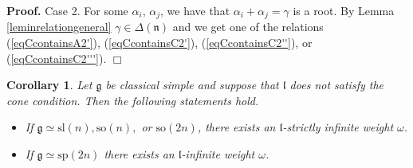 \documentclass[12pt]{report}
\newtheorem{corollary}[theo]{Corollary}
\newenvironment{proof}[1][]{ \textbf{Proof#1. }}{$\Box$\medskip}
\newcommand{\nn}{\mathfrak{n}}
\newcommand{\gG}{\mathfrak{g}}
\newcommand{\lL}{\mathfrak{l}}
\newcommand{\refle}[1]{Lemma \ref{#1}}
\newcommand{\refeq}[1]{(\ref{#1})}
\newcommand{\sL}{\mathrm{sl}}
\newcommand{\sP}{\mathrm{sp}}
\newcommand{\so}{\mathrm{so}}
\begin{document}
\begin{proof}
\smallskip\noindent Case 2. For some $\alpha_i$, $\alpha_j$, we have that $\alpha_i+\alpha_j=\gamma$ is a root. By \refle{leminrelationgeneral} $\gamma\in\Delta(\nn)$ and we get one of the relations \refeq{eqCcontainsA2'}, \refeq{eqCcontainsC2'},  (\ref{eqCcontainsC2''}), or (\ref{eqCcontainsC2'''}).
\end{proof}
\begin{corollary}\label{corConeImpliesNotFKFT}
Let $\gG$ be classical simple and suppose that $\lL$ does not satisfy the cone condition. Then the following statements hold.
\begin{itemize}
\item If $\gG\simeq \sL(n), \so(n),$ or $\so(2n)$, there exists an $\lL$-strictly infinite weight $\omega$.
\item If $\gG\simeq \sP(2n)$ there exists an $\lL$-infinite weight $\omega$.
\end{itemize}
\end{corollary}
\end{document}
